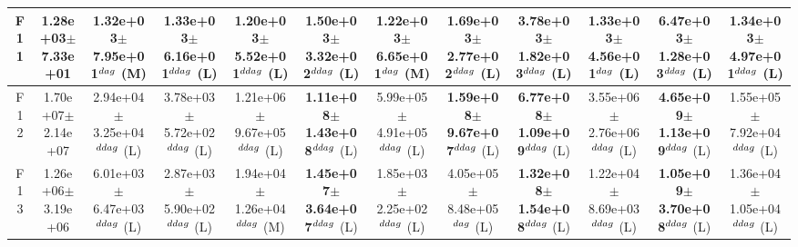 \begin{table}[!t]
\begin{tabular}{c|ccccccccccc}
F11  & 1.28e+03$\pm$7.33e+01  & \textbf{1.32e+03$\pm$7.95e+01}$^{\\dag}$ (M)  & \textbf{1.33e+03$\pm$6.16e+01}$^{\\ddag}$ (L)  & 1.20e+03$\pm$5.52e+01$^{\\ddag}$ (L)  & \textbf{1.50e+03$\pm$3.32e+02}$^{\\ddag}$ (L)  & 1.22e+03$\pm$6.65e+01$^{\\dag}$ (M)  & \textbf{1.69e+03$\pm$2.77e+02}$^{\\ddag}$ (L)  & \textbf{3.78e+03$\pm$1.82e+03}$^{\\ddag}$ (L)  & \textbf{1.33e+03$\pm$4.56e+01}$^{\\dag}$ (L)  & \textbf{6.47e+03$\pm$1.28e+03}$^{\\ddag}$ (L)  & \textbf{1.34e+03$\pm$4.97e+01}$^{\\ddag}$ (L) \\ \hline
F12  & 1.70e+07$\pm$2.14e+07  & 2.94e+04$\pm$3.25e+04$^{\\ddag}$ (L)  & 3.78e+03$\pm$5.72e+02$^{\\ddag}$ (L)  & 1.21e+06$\pm$9.67e+05$^{\\ddag}$ (L)  & \textbf{1.11e+08$\pm$1.43e+08}$^{\\ddag}$ (L)  & 5.99e+05$\pm$4.91e+05$^{\\ddag}$ (L)  & \textbf{1.59e+08$\pm$9.67e+07}$^{\\ddag}$ (L)  & \textbf{6.77e+08$\pm$1.09e+09}$^{\\ddag}$ (L)  & 3.55e+06$\pm$2.76e+06$^{\\ddag}$ (L)  & \textbf{4.65e+09$\pm$1.13e+09}$^{\\ddag}$ (L)  & 1.55e+05$\pm$7.92e+04$^{\\ddag}$ (L) \\ \hline
F13  & 1.26e+06$\pm$3.19e+06  & 6.01e+03$\pm$6.47e+03$^{\\ddag}$ (L)  & 2.87e+03$\pm$5.90e+02$^{\\ddag}$ (L)  & 1.94e+04$\pm$1.26e+04$^{\\ddag}$ (M)  & \textbf{1.45e+07$\pm$3.64e+07}$^{\\ddag}$ (L)  & 1.85e+03$\pm$2.25e+02$^{\\ddag}$ (L)  & 4.05e+05$\pm$8.48e+05$^{\\dag}$ (L)  & \textbf{1.32e+08$\pm$1.54e+08}$^{\\ddag}$ (L)  & 1.22e+04$\pm$8.69e+03$^{\\ddag}$ (L)  & \textbf{1.05e+09$\pm$3.70e+08}$^{\\ddag}$ (L)  & 1.36e+04$\pm$1.05e+04$^{\\ddag}$ (L) \\ \hline

\end{tabular}
\end{table}
